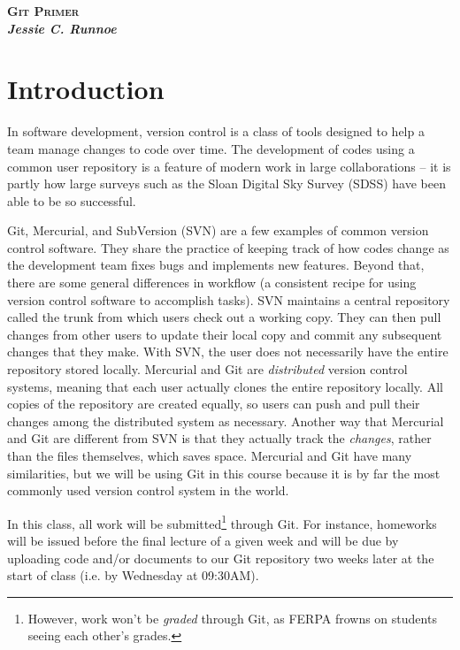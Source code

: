 \documentclass[12pt, letterpaper]{article}
\begin{document}
\hypertarget{refbkmk}{}%
\begin{center}
\bf{\textsc{\Large{Git Primer}}} \\
\bf{\it{\normalsize{Jessie C. Runnoe}}} \\
\end{center}

\hypertarget{refbkmk2}{}%
\section*{Introduction}

In software development, version control is a class of tools designed to help a team manage changes to code over time.  The development of codes using a common user repository is a feature of modern work in large collaborations -- it is partly how large surveys such as the Sloan Digital Sky Survey (SDSS) have been able to be so successful.  

Git, Mercurial, and SubVersion (SVN) are a few examples of common version control software.  They share the practice of keeping track of how codes change as the development team fixes bugs and implements new features.  Beyond that, there are some general differences in workflow (a consistent recipe for using version control software to accomplish tasks).  SVN maintains a central repository called the trunk from which users check out a working copy.  They can then pull changes from other users to update their local copy and commit any subsequent changes that they make.  With SVN, the user does not necessarily have the entire repository stored locally.  Mercurial and Git are {\it distributed} version control systems, meaning that each user actually clones the entire repository locally.  All copies of the repository are created equally, so users can push and pull their changes among the distributed system as necessary.  Another way that Mercurial and Git are different from SVN is that they actually track the {\it changes}, rather than the files themselves, which saves space.  Mercurial and Git have many similarities, but we will be using Git in this course because it is by far the most commonly used version control system in the world.

In this class, all work will be submitted\footnote{However, work won't be {\it graded} through Git, as FERPA frowns on students seeing each other's grades.} through Git.  For instance, homeworks will be issued before the final lecture of a given week and will be due by uploading code and/or documents to our Git repository two weeks later at the start of class (i.e. by Wednesday at 09:30AM).
\end{document}
